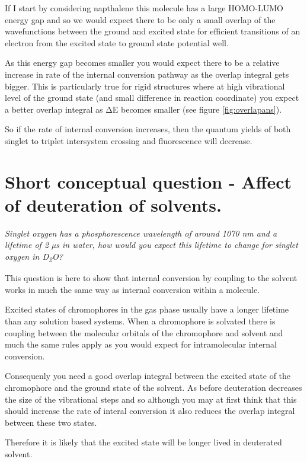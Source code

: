 \documentclass[
]{book}
\begin{document}
If I start by considering napthalene this molecule has a large HOMO-LUMO energy gap and so we would expect there to be only a small overlap of the wavefunctions between the ground and excited state for efficient transitions of an electron from the excited state to ground state potential well.

As this energy gap becomes smaller you would expect there to be a relative increase in rate of the internal conversion pathway as the overlap integral gets bigger. This is particularly true for rigid structures where at high vibrational level of the ground state (and small difference in reaction coordinate) you expect a better overlap integral as ΔE becomes smaller (see figure \ref{fig:overlapans}).

So if the rate of internal conversion increases, then the quantum yields of both singlet to triplet intersystem crossing and fluorescence will decrease.

\hypertarget{sec:dsolvent}{%
\section{Short conceptual question - Affect of deuteration of solvents.}\label{sec:dsolvent}}

\emph{Singlet oxygen has a phosphorescence wavelength of around 1070 nm and a lifetime of 2 µs in water, how would you expect this lifetime to change for singlet oxygen in D\textsubscript{2}O?}

This question is here to show that internal conversion by coupling to the solvent works in much the same way as internal conversion within a molecule.

Excited states of chromophores in the gas phase usually have a longer lifetime than any solution based systems. When a chromophore is solvated there is coupling between the molecular orbitals of the chromophore and solvent and much the same rules apply as you would expect for intramolecular internal conversion.

Consequenly you need a good overlap integral between the excited state of the chromophore and the ground state of the solvent. As before deuteration decreases the size of the vibrational steps and so although you may at first think that this should increase the rate of interal conversion it also reduces the overlap integral between these two states.

Therefore it is likely that the excited state will be longer lived in deuterated solvent.
\end{document}
